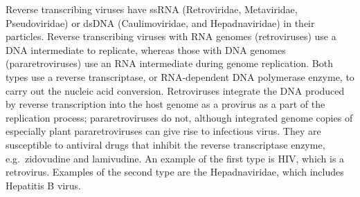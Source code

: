 Reverse transcribing viruses have ssRNA (Retroviridae, Metaviridae, Pseudoviridae) or dsDNA (Caulimoviridae, and Hepadnaviridae) in their particles. Reverse transcribing viruses with RNA genomes (retroviruses) use a DNA intermediate to replicate, whereas those with DNA genomes (pararetroviruses) use an RNA intermediate during genome replication. Both types use a reverse transcriptase, or RNA-dependent DNA polymerase enzyme, to carry out the nucleic acid conversion. Retroviruses integrate the DNA produced by reverse transcription into the host genome as a provirus as a part of the replication process; pararetroviruses do not, although integrated genome copies of especially plant pararetroviruses can give rise to infectious virus. They are susceptible to antiviral drugs that inhibit the reverse transcriptase enzyme, e.g.~zidovudine and lamivudine. An example of the first type is HIV, which is a retrovirus. Examples of the second type are the Hepadnaviridae, which includes Hepatitis B virus.



